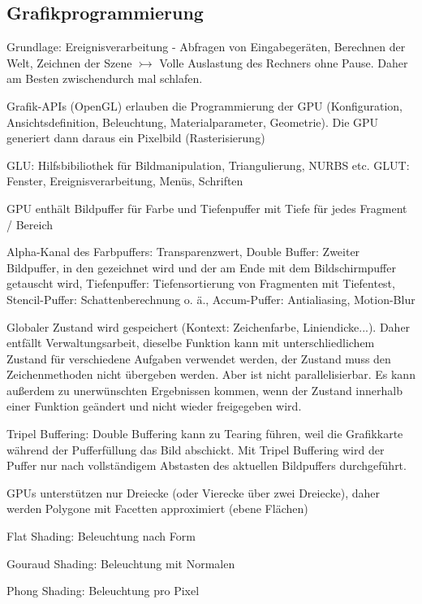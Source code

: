 \documentclass[12pt,landscape]{article}
\begin{document}
\begin{multicols}{3}
\section{Grafikprogrammierung}
\begin{compactitem}
\item Grundlage: Ereignisverarbeitung - Abfragen von Eingabegeräten, Berechnen der Welt, Zeichnen der Szene $\rightarrowtail$ Volle Auslastung des Rechners ohne Pause. Daher am Besten zwischendurch mal schlafen.
\item Grafik-APIs (OpenGL) erlauben die Programmierung der GPU (Konfiguration, Ansichtsdefinition, Beleuchtung, Materialparameter, Geometrie). Die GPU generiert dann daraus ein Pixelbild (Rasterisierung)
\item GLU: Hilfsbibiliothek für Bildmanipulation, Triangulierung, NURBS etc. GLUT: Fenster, Ereignisverarbeitung, Menüs, Schriften
\item GPU enthält Bildpuffer für Farbe und Tiefenpuffer mit Tiefe für jedes Fragment / Bereich
\item Alpha-Kanal des Farbpuffers: Transparenzwert, Double Buffer: Zweiter Bildpuffer, in den gezeichnet wird und der am Ende mit dem Bildschirmpuffer getauscht wird, Tiefenpuffer: Tiefensortierung von Fragmenten mit Tiefentest, Stencil-Puffer: Schattenberechnung o. ä., Accum-Puffer: Antialiasing, Motion-Blur
\item Globaler Zustand wird gespeichert (Kontext: Zeichenfarbe, Liniendicke...). Daher entfällt Verwaltungsarbeit, dieselbe Funktion kann mit unterschliedlichem Zustand für verschiedene Aufgaben verwendet werden, der Zustand muss den Zeichenmethoden nicht übergeben werden. Aber ist nicht parallelisierbar. Es kann außerdem zu unerwünschten Ergebnissen kommen, wenn der Zustand innerhalb einer Funktion geändert und nicht wieder freigegeben wird.
\item Tripel Buffering: Double Buffering kann zu Tearing führen, weil die Grafikkarte während der Pufferfüllung das Bild abschickt. Mit Tripel Buffering wird der Puffer nur nach vollständigem Abstasten des aktuellen Bildpuffers durchgeführt.
\item GPUs unterstützen nur Dreiecke (oder Vierecke über zwei Dreiecke), daher werden Polygone mit Facetten approximiert (ebene Flächen)
\item Flat Shading: Beleuchtung nach Form
\item Gouraud Shading: Beleuchtung mit Normalen
\item Phong Shading: Beleuchtung pro Pixel

\end{compactitem}
\end{multicols}
\end{document}

